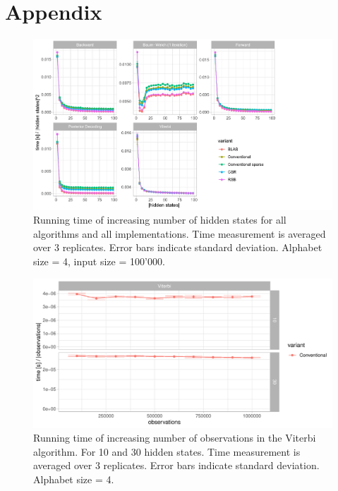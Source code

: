 \appendix
\section{Appendix}







\begin{figure}[H]
    \centering
  \includegraphics[scale=0.85]{figures/figure_C3_scaled.pdf}
    \caption{Running time of increasing number of hidden states for all algorithms and all implementations. Time measurement is averaged over 3 replicates. Error bars indicate standard deviation. Alphabet size = 4, input size = 100'000.}
    \label{app:hiddenstates}
\end{figure}




\begin{figure}[H]
    \centering
    \includegraphics[scale=0.85]{figures/figure_A3_scaled.pdf}
    \caption{Running time of increasing number of observations in the Viterbi algorithm. For 10 and 30 hidden states. Time measurement is averaged over 3 replicates. Error bars indicate standard deviation. Alphabet size = 4. }
    \label{app:viterbi}
\end{figure}


